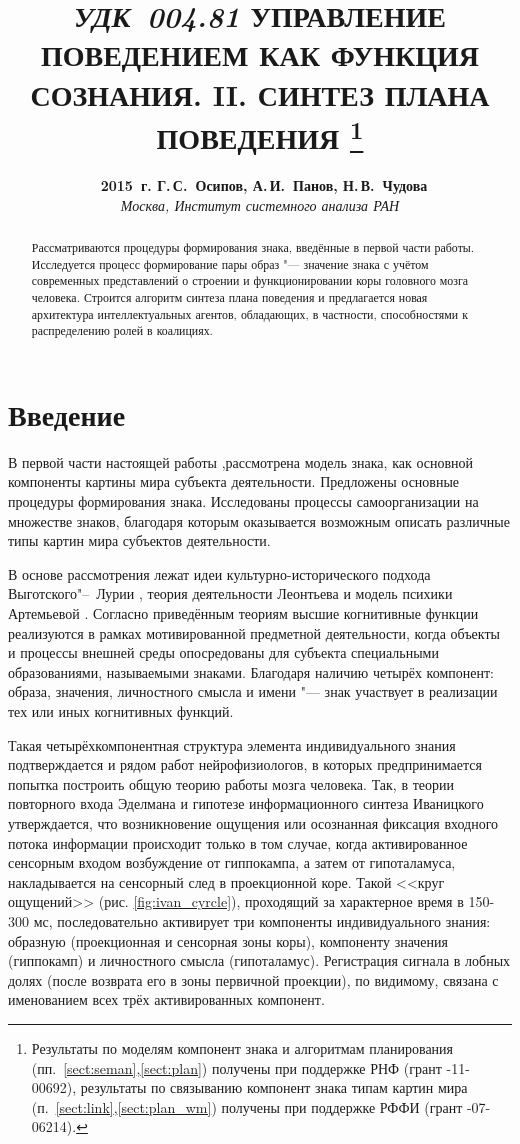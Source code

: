 \documentclass[a4paper, 12pt]{article}
\title{
	\hbox{\normalsize\textit{УДК 004.81}}
	\hbox{}\textbf{\Large\MakeUppercase{Управление поведением как функция сознания. II. Синтез плана поведения}}
	\footnote{Результаты по моделям компонент знака и алгоритмам планирования (пп.~\ref{sect:seman},\ref{sect:plan}) получены при поддержке РНФ (грант \textnumero 14-11-00692), результаты по связыванию компонент знака типам картин мира (п.~\ref{sect:link},\ref{sect:plan_wm}) получены при поддержке РФФИ (грант \textnumero 15-07-06214).}
}
\author{
	\textbf{\textcopyright~2015~г. Г.\,С.~Осипов, А.\,И.~Панов, Н.\,В.~Чудова}\\
	\normalsize\textit{Москва, Институт системного анализа РАН}
}
\date{}
\theoremstyle{plain}
\begin{document}
	\vspace*{-5\baselineskip}			%
	{\let\newpage\relax\maketitle}
	
	\begin{abstract}
		\noindent Рассматриваются процедуры формирования знака, введённые в первой части работы. Исследуется процесс формирование пары образ "--- значение знака с учётом современных представлений о строении и функционировании коры головного мозга человека. Строится алгоритм синтеза плана поведения и предлагается новая архитектура интеллектуальных агентов, обладающих, в частности, способностями к распределению ролей в коалициях.
	\end{abstract}	
	
	\section*{Введение}
	В первой части настоящей работы \cite{PanovA2014a},рассмотрена модель знака, как основной компоненты картины мира субъекта деятельности. Предложены основные процедуры формирования знака. Исследованы процессы самоорганизации на множестве знаков, благодаря которым оказывается возможным описать различные типы картин мира субъектов деятельности.
	
	В основе рассмотрения лежат идеи культурно-исторического подхода Выготского"--~Лурии \cite{Luria1970,Vygotsky2005}, теория деятельности Леонтьева \cite{Leontiev1975} и модель психики Артемьевой \cite{Artemyeva1980}. Согласно приведённым теориям высшие когнитивные функции реализуются в рамках мотивированной предметной деятельности, когда объекты и процессы внешней  среды опосредованы для субъекта специальными образованиями, называемыми знаками. Благодаря наличию четырёх компонент: образа, значения, личностного смысла и имени "--- знак участвует в реализации тех или иных когнитивных функций. 
	
	Такая четырёхкомпонентная структура элемента индивидуального знания подтверждается и рядом работ нейрофизиологов, в которых предпринимается попытка построить общую теорию работы мозга человека. Так, в теории повторного входа Эделмана \cite{Edelmen1981} и гипотезе информационного синтеза Иваницкого \cite{Ivanitsky1996,Ivanitsky2010} утверждается, что возникновение ощущения или осознанная фиксация входного потока информации происходит только в том случае, когда активированное сенсорным входом возбуждение от гиппокампа, а затем от гипоталамуса, накладывается на сенсорный след в проекционной коре. Такой <<круг ощущений>> (рис. \ref{fig:ivan_cyrcle}), проходящий за характерное время в 150-300 мс, последовательно активирует три компоненты индивидуального знания: образную (проекционная и сенсорная зоны коры), компоненту значения (гиппокамп) и личностного смысла (гипоталамус). Регистрация сигнала в лобных долях (после возврата его в зоны первичной проекции), по видимому, связана с именованием всех трёх активированных компонент.
	
\end{document}
